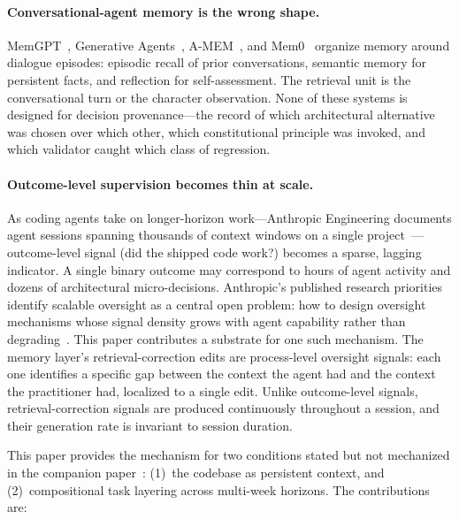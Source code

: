 \documentclass[11pt]{article}
\begin{document}
\paragraph{Conversational-agent memory is the wrong shape.}
MemGPT~\citep{packer2023memgpt}, Generative Agents~\citep{park2023generative}, A-MEM~\citep{xu2024amem}, and Mem0~\citep{chhikara2025mem0} organize memory around dialogue episodes: episodic recall of prior conversations, semantic memory for persistent facts, and reflection for self-assessment.
The retrieval unit is the conversational turn or the character observation.
None of these systems is designed for decision provenance---the record of which architectural alternative was chosen over which other, which constitutional principle was invoked, and which validator caught which class of regression.

\paragraph{Outcome-level supervision becomes thin at scale.}
As coding agents take on longer-horizon work---Anthropic Engineering documents agent sessions spanning thousands of context windows on a single project~\citep{anthropic2026harnesses}---outcome-level signal (did the shipped code work?) becomes a sparse, lagging indicator.
A single binary outcome may correspond to hours of agent activity and dozens of architectural micro-decisions.
Anthropic's published research priorities identify scalable oversight as a central open problem: how to design oversight mechanisms whose signal density grows with agent capability rather than degrading~\citep{anthropic2025recommended}.
This paper contributes a substrate for one such mechanism.
The memory layer's retrieval-correction edits are process-level oversight signals: each one identifies a specific gap between the context the agent had and the context the practitioner had, localized to a single edit.
Unlike outcome-level signals, retrieval-correction signals are produced continuously throughout a session, and their generation rate is invariant to session duration.

\medskip

This paper provides the mechanism for two conditions stated but not mechanized in the companion paper~\citep[\S2]{ovcharov2026recursive}: (1)~the codebase as persistent context, and (2)~compositional task layering across multi-week horizons.
The contributions are:
\end{document}
